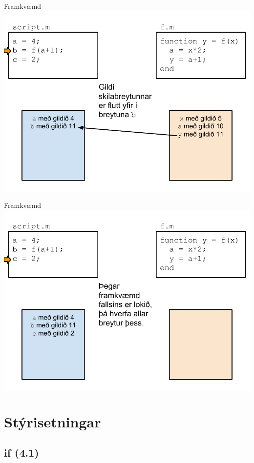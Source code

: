 \documentclass{beamer}
\begin{document}
\begin{frame}{Framkvæmd}
\includegraphics[width=\textwidth]{Pics/framkvaemd-falls-6}
\end{frame}
\begin{frame}{Framkvæmd}
\includegraphics[width=\textwidth]{Pics/framkvaemd-falls-7}
\end{frame}

\section{Stýrisetningar}

\subsection{if (4.1)}
\end{document}
